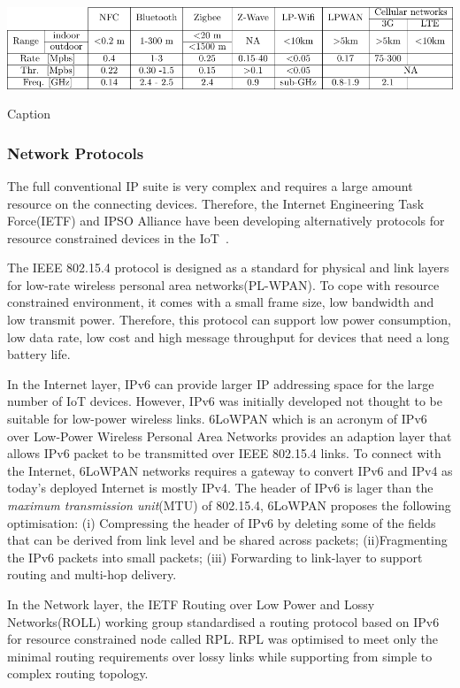 \begin{table}[ht!]
    \centering
    \includegraphics[scale=.95]{Table/2-2-wireless.pdf}
    \caption{Caption}
    \label{tab:wireless}
\end{table}

\subsubsection{Network Protocols}

The full conventional IP suite is very complex and requires a large amount resource on the connecting devices.  
Therefore, the Internet Engineering Task Force(IETF) and IPSO Alliance have been developing alternatively protocols for resource constrained devices in the IoT~\citep{Ishaq:2013, alliance:2011}. 

The IEEE 802.15.4 protocol is designed as a standard for physical and link layers for low-rate wireless personal area networks(PL-WPAN).
To cope with resource constrained environment, it comes with a small frame size, low bandwidth and low transmit power.
Therefore, this protocol can support low power consumption, low data rate, low cost and high message throughput for devices that need a long battery life.

In the Internet layer, IPv6 can provide larger IP addressing space for the large number of IoT devices. 
However, IPv6 was initially developed not thought to be suitable for low-power wireless links.
6LoWPAN which is an acronym of IPv6 over Low-Power Wireless Personal Area Networks provides an adaption layer that allows IPv6 packet to be transmitted over IEEE 802.15.4 links.
To connect with the Internet, 6LoWPAN networks requires a gateway to convert IPv6 and IPv4 as today’s deployed Internet is mostly IPv4. 
The header of IPv6 is lager than the \textit{maximum transmission unit}(MTU) of 802.15.4, 6LoWPAN proposes the following optimisation:
(i) Compressing the header of IPv6 by deleting some of the fields that can be derived from link level and be shared across packets;
(ii)Fragmenting the IPv6 packets into small packets;
(iii) Forwarding to link-layer to support routing and multi-hop delivery.

In the Network layer, the IETF Routing over Low Power and Lossy Networks(ROLL) working group standardised a routing protocol based on IPv6 for resource constrained node called RPL.
RPL was optimised to meet only the minimal routing requirements over lossy links while supporting from simple to complex routing topology.


